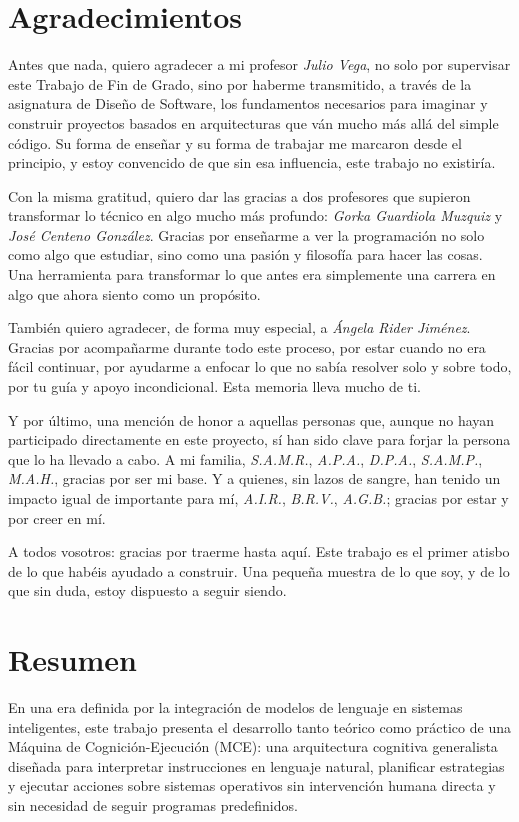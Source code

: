 \chapter*{Agradecimientos}
\noindent
Antes que nada, quiero agradecer a mi profesor \emph{Julio Vega}, no solo por
supervisar este Trabajo de Fin de Grado, sino por haberme transmitido, a través
de la asignatura de Diseño de Software, los fundamentos necesarios para imaginar
y construir proyectos basados en arquitecturas que ván mucho más allá del simple código.
Su forma de enseñar y su forma de trabajar me marcaron desde el principio, y
estoy convencido de que sin esa influencia, este trabajo no existiría.

Con la misma gratitud, quiero dar las gracias a dos profesores que supieron
transformar lo técnico en algo mucho más profundo: \emph{Gorka Guardiola Muzquiz} y \emph{José
Centeno González}. Gracias por enseñarme a ver la programación no solo
como algo que estudiar, sino como una pasión y filosofía para hacer las cosas.
Una herramienta para transformar lo que antes era simplemente una carrera
en algo que ahora siento como un propósito.

También quiero agradecer, de forma muy especial, a \emph{Ángela Rider Jiménez}. Gracias
por acompañarme durante todo este proceso, por estar cuando no era fácil
continuar, por ayudarme a enfocar lo que no sabía resolver solo y sobre todo,
por tu guía y apoyo incondicional. Esta memoria lleva mucho de ti.

Y por último, una mención de honor a aquellas personas que, aunque no hayan
participado directamente en este proyecto, sí han sido clave para forjar la
persona que lo ha llevado a cabo. A mi familia, \emph{S.A.M.R.}, \emph{A.P.A.}, \emph{D.P.A.}, \emph{S.A.M.P.}, \emph{M.A.H.},
gracias por ser mi base. Y a quienes, sin lazos de sangre, han tenido un impacto
igual de importante para mí, \emph{A.I.R.}, \emph{B.R.V.}, \emph{A.G.B.}; gracias 
por estar y por creer en mí.

A todos vosotros: gracias por traerme hasta aquí. Este trabajo es el 
primer atisbo de lo que habéis ayudado a construir. Una pequeña muestra 
de lo que soy, y de lo que sin duda, estoy dispuesto a seguir siendo.


\chapter*{Resumen}
\noindent
En una era definida por la integración de modelos de lenguaje en sistemas
inteligentes, este trabajo presenta el desarrollo tanto teórico como práctico de
una Máquina de Cognición-Ejecución (MCE): una arquitectura cognitiva generalista
diseñada para interpretar instrucciones en lenguaje natural, planificar
estrategias y ejecutar acciones sobre sistemas operativos sin intervención
humana directa y sin necesidad de seguir programas predefinidos.

